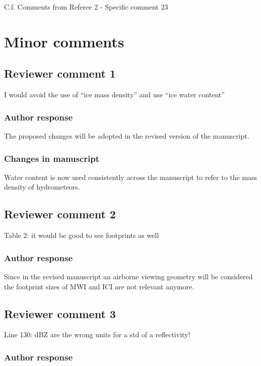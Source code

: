 C.f. Comments from Referee 2 - Specific comment 23

\section{Minor comments}

\subsection*{Reviewer comment 1}
I would avoid the use of “ice mass density” and use “ice water content”

\subsubsection*{Author response}

The proposed changes will be adopted in the revised version of the manuscript.

\subsubsection*{Changes in manuscript}

Water content is now used consistently across the manuscript to refer to the mass
density of hydrometeors.

\subsection*{Reviewer comment 2}

Table 2:  it would be good to see footprints as well

\subsubsection*{Author response}

Since in the revised manuscript an airborne viewing geometry will be considered
the footprint sizes of MWI and ICI are not relevant anymore.

\subsection*{Reviewer comment 3}

Line 130: dBZ are the wrong units for a std of a reflectivity!

\subsubsection*{Author response}


